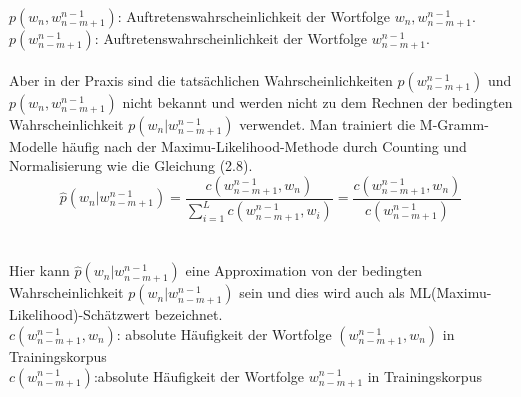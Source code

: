 $p(w_{n},w_{n-m+1}^{n-1})$: Auftretenswahrscheinlichkeit der Wortfolge $w_{n},w_{n-m+1}^{n-1}$.
$p(w_{n-m+1}^{n-1})$: Auftretenswahrscheinlichkeit der Wortfolge $w_{n-m+1}^{n-1}$.
\\
\\
Aber in der Praxis sind die tats\"achlichen Wahrscheinlichkeiten $p(w_{n-m+1}^{n-1})$  und $p(w_{n},w_{n-m+1}^{n-1})$ nicht bekannt und werden nicht zu dem Rechnen der bedingten Wahrscheinlichkeit $p(w_{n}|w_{n-m+1}^{n-1})$ verwendet. Man trainiert die M-Gramm-Modelle h\"aufig nach der Maximu-Likelihood-Methode \cite{int_MLE} durch Counting und Normalisierung wie die Gleichung (2.8). 
\begin{equation}
\hat{p}(w_{n}|w_{n-m+1}^{n-1})=\frac{c(w_{n-m+1}^{n-1},w_{n} )}{ \sum_{i=1}^L c(w_{n-m+1}^{n-1},w_{i})}=\frac{c(w_{n-m+1}^{n-1},w_{n} )}{c(w_{n-m+1}^{n-1})}
\end{equation}
\\
\\
Hier kann $\hat{p}(w_{n}|w_{n-m+1}^{n-1})$  eine Approximation von der bedingten Wahrscheinlichkeit $p(w_{n}|w_{n-m+1}^{n-1})$ sein und dies wird auch als ML(Maximu-Likelihood)-Sch\"atzwert bezeichnet.\\
$c(w_{n-m+1}^{n-1},w_{n})$: absolute H\"aufigkeit der Wortfolge $(w_{n-m+1}^{n-1},w_{n})$ in Trainingskorpus\\
$c(w_{n-m+1}^{n-1})$:absolute H\"aufigkeit der Wortfolge $w_{n-m+1}^{n-1}$ in Trainingskorpus\\

